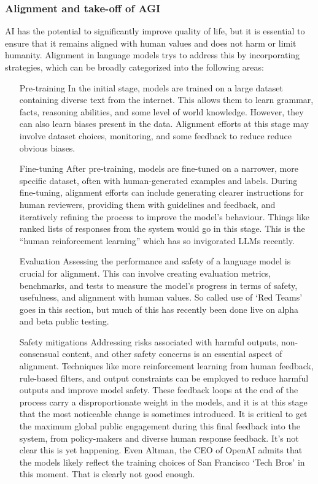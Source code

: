 \subsubsection{Alignment and take-off of AGI}
AI has the potential to significantly improve quality of life, but it is essential to ensure that it remains aligned with human values and does not harm or limit humanity. Alignment in language models trys to address this by incorporating strategies, which can be broadly categorized into the following areas:
\begin{itemize}
\item [Pre-training] In the initial stage, models are trained on a large dataset containing diverse text from the internet. This allows them to learn grammar, facts, reasoning abilities, and some level of world knowledge. However, they can also learn biases present in the data. Alignment efforts at this stage may involve dataset choices, monitoring, and some feedback to reduce reduce obvious biases.
\item [Fine-tuning] After pre-training, models are fine-tuned on a narrower, more specific dataset, often with human-generated examples and labels. During fine-tuning, alignment efforts can include generating clearer instructions for human reviewers, providing them with guidelines and feedback, and iteratively refining the process to improve the model's behaviour. Things like ranked lists of responses from the system would go in this stage. This is the ``human reinforcement learning'' which has so invigorated LLMs recently.
\item [Evaluation] Assessing the performance and safety of a language model is crucial for alignment. This can involve creating evaluation metrics, benchmarks, and tests to measure the model's progress in terms of safety, usefulness, and alignment with human values. So called use of `Red Teams' goes in this section, but much of this has recently been done live on alpha and beta public testing. 
\item [Safety mitigations] Addressing risks associated with harmful outputs, non-consensual content, and other safety concerns is an essential aspect of alignment. Techniques like more reinforcement learning from human feedback, rule-based filters, and output constraints can be employed to reduce harmful outputs and improve model safety. These feedback loops at the end of the process carry a disproportionate weight in the models, and it is at this stage that the most noticeable change is sometimes introduced. It is critical to get the maximum global public engagement during this final feedback into the system, from policy-makers and diverse human response feedback. It's not clear this is yet happening. Even Altman, the CEO of OpenAI admits that the models likely reflect the training choices of San Francisco `Tech Bros' in this moment. That is clearly not good enough.
\end{itemize}
